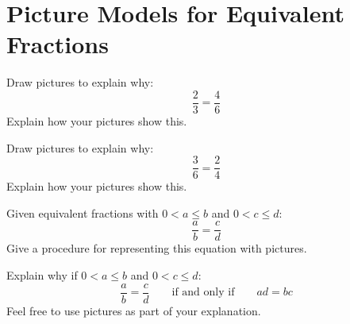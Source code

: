 \newpage
\section{Picture Models for Equivalent Fractions}\label{A:EF}


\begin{prob} 
Draw pictures to explain why:
\[
\frac{2}{3} = \frac{4}{6}
\]
Explain how your pictures show this.
\end{prob}


\begin{prob} 
Draw pictures to explain why:
\[
\frac{3}{6} = \frac{2}{4}
\]
Explain how your pictures show this.
\end{prob}



\begin{prob} 
Given equivalent fractions with $0< a\le b$ and $0 < c\le d$:
\[
\frac{a}{b} = \frac{c}{d}
\]
Give a procedure for representing this equation with pictures.
\end{prob}


\begin{prob} 
Explain why if $0< a\le b$ and $0 < c\le d$:
\[
\frac{a}{b} = \frac{c}{d}\qquad \text{if and only if}\qquad ad = bc
\]
Feel free to use pictures as part of your explanation.
\end{prob}
